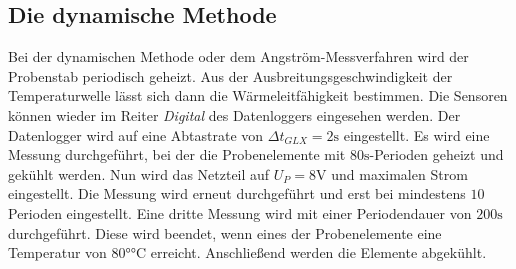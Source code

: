 \subsection{Die dynamische Methode}
Bei der dynamischen Methode oder dem Angström-Messverfahren wird der Probenstab
periodisch geheizt. Aus der Ausbreitungsgeschwindigkeit der Temperaturwelle lässt sich
dann die Wärmeleitfähigkeit bestimmen. Die Sensoren können wieder im Reiter \textit{Digital}
des Datenloggers eingesehen werden. Der Datenlogger wird auf eine Abtastrate von
$\Delta t_{GLX} = 2 \si{\second}$ eingestellt. Es wird eine Messung durchgeführt,
bei der die Probenelemente mit $80 \si{\second}$-Perioden geheizt und gekühlt werden.
Nun wird das Netzteil auf $U_P = 8 \si{\volt}$ und maximalen Strom eingestellt.
Die Messung wird erneut durchgeführt und erst bei mindestens $10$ Perioden eingestellt.
Eine dritte Messung wird mit einer Periodendauer von $200 \si{\second}$ durchgeführt.
Diese wird beendet, wenn eines der Probenelemente eine Temperatur von $80 \si{\degree\celsius}$
erreicht. Anschließend werden die Elemente abgekühlt.
